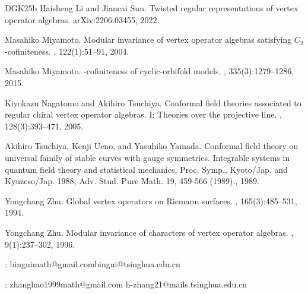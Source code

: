 \documentclass[11pt,b5paper,notitlepage]{article}
\theoremstyle{definition}
\theoremstyle{plain}
\newcommand{\<}{\left\langle}
\renewcommand{\>}{\right\rangle}
\numberwithin{equation}{section}
\begin{document}
\begin{thebibliography}{DGK25b}
Haisheng Li and Jiancai Sun.
\newblock Twisted regular representations of vertex operator algebras.
\newblock arXiv:2206.03455, 2022.

Masahiko Miyamoto.
\newblock Modular invariance of vertex operator algebras satisfying
  {$C_2$}-cofiniteness.
, 122(1):51--91, 2004.

Masahiko Miyamoto.
-cofiniteness of cyclic-orbifold models.
, 335(3):1279--1286, 2015.

Kiyokazu Nagatomo and Akihiro Tsuchiya.
\newblock Conformal field theories associated to regular chiral vertex operator
  algebras. {I}: {Theories} over the projective line.
, 128(3):393--471, 2005.

Akihiro Tsuchiya, Kenji Ueno, and Yasuhiko Yamada.
\newblock Conformal field theory on universal family of stable curves with
  gauge symmetries.
\newblock Integrable systems in quantum field theory and statistical mechanics,
  {Proc}. {Symp}., {Kyoto}/{Jap}. and {Kyuzeso}/{Jap}. 1988, {Adv}. {Stud}.
  {Pure} {Math}. 19, 459-566 (1989)., 1989.

Yongchang Zhu.
\newblock Global vertex operators on {Riemann} surfaces.
, 165(3):485--531, 1994.

Yongchang Zhu.
\newblock Modular invariance of characters of vertex operator algebras.
, 9(1):237--302, 1996.

\end{thebibliography}










: binguimath@gmail.com\qquad bingui@tsinghua.edu.cn\\


: zhanghao1999math@gmail.com \qquad h-zhang21@mails.tsinghua.edu.cn
\end{document}
